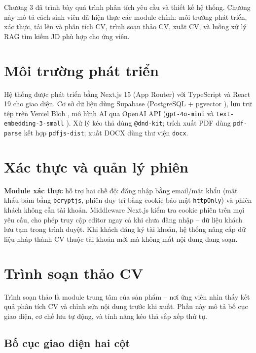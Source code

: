 \documentclass[../DoAn.tex]{subfiles}
\begin{document}
Chương 3 đã trình bày quá trình phân tích yêu cầu và thiết kế hệ thống. Chương này mô tả cách sinh viên đã hiện thực các module chính: môi trường phát triển, xác thực, tải lên và phân tích CV, trình soạn thảo CV, xuất CV, và luồng xử lý RAG tìm kiếm JD phù hợp cho ứng viên.

\section{Môi trường phát triển}

Hệ thống được phát triển bằng Next.js 15 \cite{nextjs2024} (App Router) với TypeScript \cite{typescript2024} và React 19 \cite{react2024} cho giao diện. Cơ sở dữ liệu dùng Supabase \cite{supabase2024} (PostgreSQL + pgvector \cite{pgvector2024}), lưu trữ tệp trên Vercel Blob \cite{vercel2024}, mô hình AI qua OpenAI API (\texttt{gpt-4o-mini} \cite{openai2023gpt4} và \texttt{text-embedding-3-small} \cite{openai2024embedding}). Xử lý kéo thả dùng \texttt{@dnd-kit}; trích xuất PDF dùng \texttt{pdf-parse} kết hợp \texttt{pdfjs-dist}; xuất DOCX dùng thư viện \texttt{docx}.

\section{Xác thực và quản lý phiên}

\textbf{Module xác thực} hỗ trợ hai chế độ: đăng nhập bằng email/mật khẩu (mật khẩu băm bằng \texttt{bcryptjs}, phiên duy trì bằng cookie bảo mật \texttt{httpOnly}) và phiên khách không cần tài khoản. Middleware Next.js kiểm tra cookie phiên trên mọi yêu cầu, cho phép truy cập editor ngay cả khi chưa đăng nhập -- dữ liệu khách lưu tạm trong trình duyệt. Khi khách đăng ký tài khoản, hệ thống nâng cấp dữ liệu nháp thành CV thuộc tài khoản mới mà không mất nội dung đang soạn.

\section{Trình soạn thảo CV}
\label{sec:editor_impl}

Trình soạn thảo là module trung tâm của sản phẩm -- nơi ứng viên nhìn thấy kết quả phân tích CV và chỉnh sửa nội dung trước khi xuất. Phần này mô tả bố cục giao diện, cơ chế lưu tự động, và tính năng kéo thả sắp xếp thứ tự.

\subsection{Bố cục giao diện hai cột}
\end{document}
